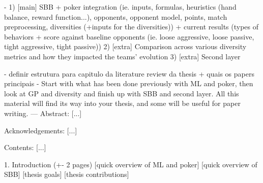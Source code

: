     - 1) [main] SBB + poker integration (ie. inputs, formulas, heuristics (hand balance, reward function...), opponents, opponent model, points, match preprocessing, diversities (+inputs for the diversities)) + current results (types of behaviors + score against baseline opponents (ie. loose aggressive, loose passive, tight aggressive, tight passive))
    2) [extra] Comparison across various diversity metrics and how they impacted the teams' evolution
    3) [extra] Second layer

- definir estrutura para capitulo da literature review da thesis + quais os papers principais
    - Start with what has been done previously with ML and poker, then look at GP and diversity and finish up with SBB and second layer. All this material will find its way into your thesis, and some will be useful for paper writing.
---
Abstract:
[...]

Acknowledgements:
[...]

Contents:
[...]

1. Introduction (+- 2 pages)
    [quick overview of ML and poker]
    [quick overview of SBB]
    [thesis goals]
    [thesis contributions]


